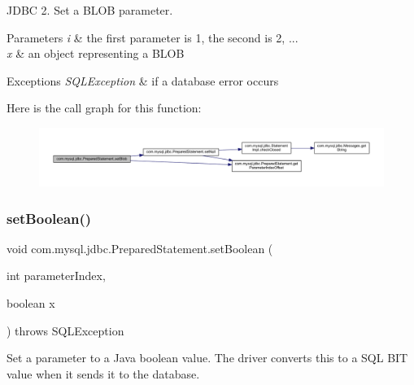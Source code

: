 J\+D\+BC 2. Set a B\+L\+OB parameter.


\begin{DoxyParams}{Parameters}
{\em i} & the first parameter is 1, the second is 2, ... \\
\hline
{\em x} & an object representing a B\+L\+OB\\
\hline
\end{DoxyParams}

\begin{DoxyExceptions}{Exceptions}
{\em S\+Q\+L\+Exception} & if a database error occurs \\
\hline
\end{DoxyExceptions}
Here is the call graph for this function\+:
\nopagebreak
\begin{figure}[H]
\begin{center}
\leavevmode
\includegraphics[width=350pt]{classcom_1_1mysql_1_1jdbc_1_1_prepared_statement_a923cc59072cb8539196d7288f1830f0d_cgraph}
\end{center}
\end{figure}
\mbox{\label{classcom_1_1mysql_1_1jdbc_1_1_prepared_statement_a9f0e5dd8b1cae6d2f116ae694577b2ce}} 
\subsubsection{\texorpdfstring{set\+Boolean()}{setBoolean()}}
{\footnotesize\ttfamily void com.\+mysql.\+jdbc.\+Prepared\+Statement.\+set\+Boolean (\begin{DoxyParamCaption}\item[{int}]{parameter\+Index,  }\item[{boolean}]{x }\end{DoxyParamCaption}) throws S\+Q\+L\+Exception}

Set a parameter to a Java boolean value. The driver converts this to a S\+QL B\+IT value when it sends it to the database.


